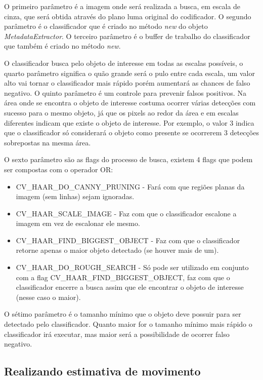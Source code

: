 O primeiro parâmetro é a imagem onde será realizada a busca, em escala de cinza, que será obtida através do plano luma original do codificador. O segundo parâmetro é o classificador que é criado no método \textit{new} do objeto \textit{MetadataExtractor}. O terceiro parâmetro é o buffer de trabalho do classificador que também é criado no método \textit{new}. 

O classificador busca pelo objeto de interesse em todas as escalas possíveis, o quarto parâmetro significa o quão grande será o pulo entre cada escala, um valor alto vai tornar o classificador mais rápido porém aumentará as chances de falso negativo. O quinto parâmetro é um controle para prevenir falsos positivos. Na área onde se encontra o objeto de interesse costuma ocorrer várias detecções com sucesso para o mesmo objeto, já que os pixels ao redor da área e em escalas diferentes indicam que existe o objeto de interesse. Por exemplo, o valor 3 indica que o classificador só considerará o objeto como presente se ocorrerem 3 detecções sobrepostas na mesma área.

O sexto parâmetro são as flags do processo de busca, existem 4 flags que podem ser compostas com o operador OR:

\begin{itemize}
	\item CV\_HAAR\_DO\_CANNY\_PRUNING - Fará com que regiões planas da imagem (sem linhas) sejam ignoradas.    
	\item CV\_HAAR\_SCALE\_IMAGE - Faz com que o classificador escalone a imagem em vez de escalonar ele mesmo.
	\item CV\_HAAR\_FIND\_BIGGEST\_OBJECT - Faz com que o classificador retorne apenas o maior objeto detectado (se houver mais de um).
	\item CV\_HAAR\_DO\_ROUGH\_SEARCH - Só pode ser utilizado em conjunto com a flag CV\_HAAR\_FIND\_BIGGEST\_OBJECT, faz com que o classificador encerre a busca assim que ele encontrar o objeto de interesse (nesse caso o maior).
\end{itemize}

O sétimo parâmetro é o tamanho mínimo que o objeto deve possuir para ser detectado pelo classificador. Quanto maior for o tamanho mínimo mais rápido o classificador irá executar, mas maior será a possibilidade de ocorrer falso negativo.


\subsection{ Realizando estimativa de movimento }

